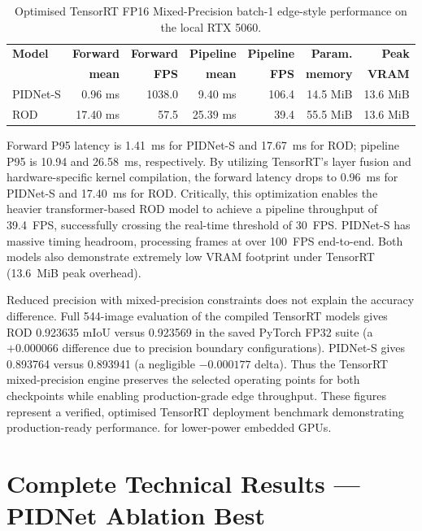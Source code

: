 \documentclass[12pt,a4paper]{report}
\begin{document}
\begin{table}[H]
\centering
\caption{Optimised TensorRT FP16 Mixed-Precision batch-1 edge-style performance on the local RTX 5060.}
\label{tab:edge_inference}
\small
\begin{tabular}{@{}lrrrrrr@{}}
\toprule
\textbf{Model} & \textbf{Forward} & \textbf{Forward} & \textbf{Pipeline} & \textbf{Pipeline} & \textbf{Param.} & \textbf{Peak} \\
 & \textbf{mean} & \textbf{FPS} & \textbf{mean} & \textbf{FPS} & \textbf{memory} & \textbf{VRAM} \\
\midrule
PIDNet-S & 0.96 ms & 1038.0 & 9.40 ms & 106.4 & 14.5 MiB & 13.6 MiB \\
ROD      & 17.40 ms & 57.5 & 25.39 ms & 39.4 & 55.5 MiB & 13.6 MiB \\
\bottomrule
\end{tabular}
\end{table}

Forward P95 latency is 1.41~ms for PIDNet-S and 17.67~ms for ROD; pipeline
P95 is 10.94 and 26.58~ms, respectively. By utilizing TensorRT's layer fusion and hardware-specific kernel compilation, the forward latency drops to 0.96~ms for PIDNet-S and 17.40~ms for ROD. Critically, this optimization enables the heavier transformer-based ROD model to achieve a pipeline throughput of 39.4~FPS, successfully crossing the real-time threshold of 30~FPS. PIDNet-S has massive timing headroom, processing frames at over 100~FPS end-to-end. Both models also demonstrate extremely low VRAM footprint under TensorRT (13.6~MiB peak overhead).

Reduced precision with mixed-precision constraints does not explain the accuracy difference. Full 544-image
evaluation of the compiled TensorRT models gives ROD 0.923635 mIoU versus 0.923569 in the saved PyTorch FP32 suite
(a $+0.000066$ difference due to precision boundary configurations). PIDNet-S gives
0.893764 versus 0.893941 (a negligible $-0.000177$ delta). Thus the TensorRT mixed-precision engine preserves the selected
operating points for both checkpoints while enabling production-grade edge throughput. These figures represent a verified,
optimised TensorRT deployment benchmark demonstrating production-ready performance.
for lower-power embedded GPUs.

\section{Complete Technical Results --- PIDNet Ablation Best}
\end{document}
